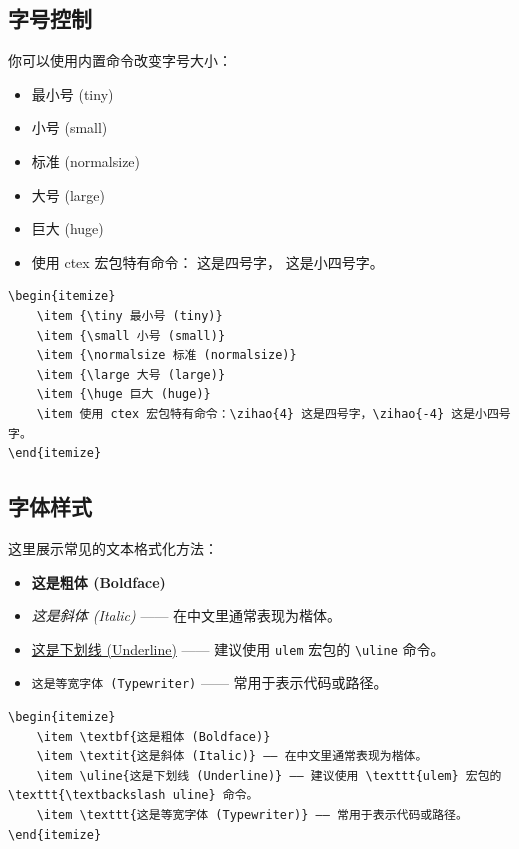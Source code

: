 \subsection{字号控制}
你可以使用内置命令改变字号大小：
\begin{itemize}
    \item {\tiny 最小号 (tiny)}
    \item {\small 小号 (small)}
    \item {\normalsize 标准 (normalsize)}
    \item {\large 大号 (large)}
    \item {\huge 巨大 (huge)}
    \item 使用 ctex 宏包特有命令： 这是四号字， 这是小四号字。
    
\end{itemize}
\begin{lstlisting}
\begin{itemize}
    \item {\tiny 最小号 (tiny)}
    \item {\small 小号 (small)}
    \item {\normalsize 标准 (normalsize)}
    \item {\large 大号 (large)}
    \item {\huge 巨大 (huge)}
    \item 使用 ctex 宏包特有命令：\zihao{4} 这是四号字，\zihao{-4} 这是小四号字。
\end{itemize}   
\end{lstlisting}
\subsection{字体样式}
这里展示常见的文本格式化方法：
\begin{itemize}
    \item \textbf{这是粗体 (Boldface)}
    \item \textit{这是斜体 (Italic)} —— 在中文里通常表现为楷体。
    \item \uline{这是下划线 (Underline)} —— 建议使用 \texttt{ulem} 宏包的 \texttt{\textbackslash uline} 命令。
    \item \texttt{这是等宽字体 (Typewriter)} —— 常用于表示代码或路径。
\end{itemize}
\begin{lstlisting}
\begin{itemize}
    \item \textbf{这是粗体 (Boldface)}
    \item \textit{这是斜体 (Italic)} —— 在中文里通常表现为楷体。
    \item \uline{这是下划线 (Underline)} —— 建议使用 \texttt{ulem} 宏包的 \texttt{\textbackslash uline} 命令。
    \item \texttt{这是等宽字体 (Typewriter)} —— 常用于表示代码或路径。
\end{itemize}    
\end{lstlisting}

